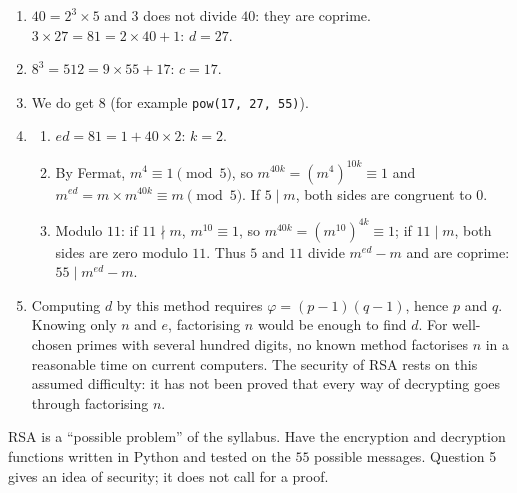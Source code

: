 \begin{solution}[Problem]
\begin{enumerate}
\item $40=2^3\times5$ and $3$ does not divide $40$: they are coprime. $3\times27=81=2\times40+1$: $d=27$.
\item $8^3=512=9\times55+17$: $c=17$.
\item We do get $8$ (for example \texttt{pow(17, 27, 55)}).
\item
\begin{enumerate}
\item $ed=81=1+40\times2$: $k=2$.
\item By Fermat, $m^4\equiv1\pmod5$, so $m^{40k}=\left(m^4\right)^{10k}\equiv1$ and $m^{ed}=m\times m^{40k}\equiv m\pmod5$. If $5\mid m$, both sides are congruent to $0$.
\item Modulo $11$: if $11\nmid m$, $m^{10}\equiv1$, so $m^{40k}=\left(m^{10}\right)^{4k}\equiv1$; if $11\mid m$, both sides are zero modulo $11$. Thus $5$ and $11$ divide $m^{ed}-m$ and are coprime: $55\mid m^{ed}-m$.
\end{enumerate}
\item Computing $d$ by this method requires $\varphi=(p-1)(q-1)$, hence $p$ and $q$. Knowing only $n$ and $e$, factorising $n$ would be enough to find $d$. For well-chosen primes with several hundred digits, no known method factorises $n$ in a reasonable time on current computers. The security of RSA rests on this assumed difficulty: it has not been proved that every way of decrypting goes through factorising $n$.
\end{enumerate}
\end{solution}
\begin{teachernote}
RSA is a ``possible problem'' of the syllabus. Have the encryption and decryption functions written in Python and tested on the $55$ possible messages. Question 5 gives an idea of security; it does not call for a proof.
\end{teachernote}

